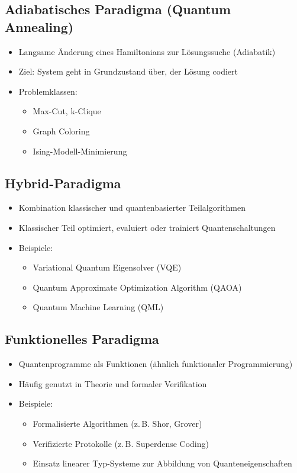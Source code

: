 \subsection{Adiabatisches Paradigma (Quantum Annealing)}
\begin{itemize}
    \item Langsame Änderung eines Hamiltonians zur Lösungssuche (Adiabatik)
    \item Ziel: System geht in Grundzustand über, der Lösung codiert
    \item Problemklassen:
    \begin{itemize}
        \item Max-Cut, k-Clique
        \item Graph Coloring
        \item Ising-Modell-Minimierung
    \end{itemize}
\end{itemize}

\subsection{Hybrid-Paradigma}
\begin{itemize}
    \item Kombination klassischer und quantenbasierter Teilalgorithmen
    \item Klassischer Teil optimiert, evaluiert oder trainiert Quantenschaltungen
    \item Beispiele:
    \begin{itemize}
        \item Variational Quantum Eigensolver (VQE)
        \item Quantum Approximate Optimization Algorithm (QAOA)
        \item Quantum Machine Learning (QML)
    \end{itemize}
\end{itemize}

\subsection{Funktionelles Paradigma}
\begin{itemize}
    \item Quantenprogramme als Funktionen (ähnlich funktionaler Programmierung)
    \item Häufig genutzt in Theorie und formaler Verifikation
    \item Beispiele:
    \begin{itemize}
        \item Formalisierte Algorithmen (z.\,B. Shor, Grover)
        \item Verifizierte Protokolle (z.\,B. Superdense Coding)
        \item Einsatz linearer Typ-Systeme zur Abbildung von Quanteneigenschaften
    \end{itemize}
\end{itemize}


